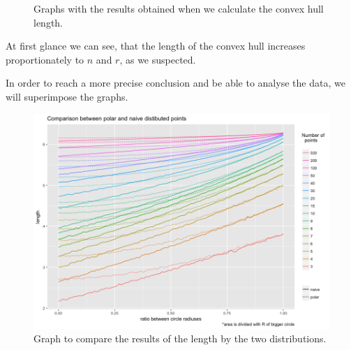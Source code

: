 \documentclass[12pt,a4paper]{article}
\begin{document}
\begin{figure}[H]
 \centering
 \caption{Graphs with the results obtained when we calculate the convex hull length.}
 \label{f:results_length}
\end{figure} 

At first glance we can see, that the length of the convex hull increases proportionately to $n$ and $r$, as we suspected.

In order to reach a more precise conclusion and be able to analyse the data, we will superimpose the graphs.
\begin{figure}[H]
\centering
\includegraphics[scale=0.48]{../graphs/graphs/length_comparison.png}
\caption{Graph to compare the results of the length by the two distributions.}
\label{f:comparison_length}
\end{figure}
\end{document}
